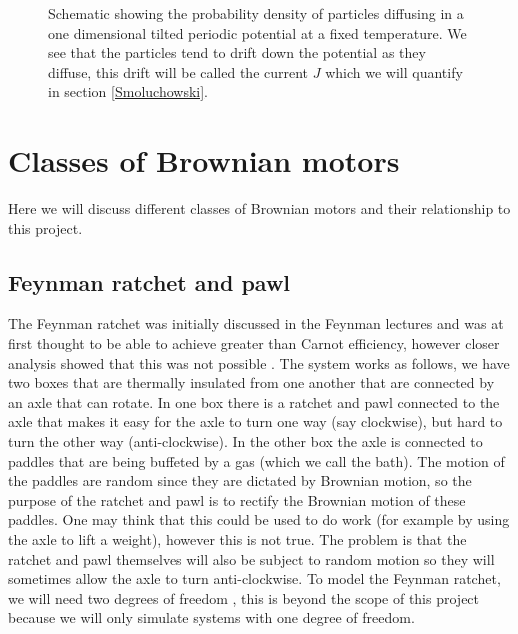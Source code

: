 \begin{figure}[tb]
	\centering
\quad
\caption{Schematic showing the probability density of particles diffusing in a one dimensional tilted periodic potential at a fixed temperature. We see that the particles tend to drift down the potential as they diffuse, this drift will be called the current $J$ which we will quantify in section \ref{Smoluchowski}.}
\label{fig:Schematic}
\end{figure}

\section{Classes of Brownian motors} \label{BrownianMotorClasses}
Here we will discuss different classes of Brownian motors and their relationship to this project.

\subsection{Feynman ratchet and pawl}
The Feynman ratchet was initially discussed in the Feynman lectures \cite{Feynman1963} and was at first thought to be able to achieve greater than Carnot efficiency, however closer analysis showed that this was not possible \cite{ParrondoEspanol1996}. The system works as follows, we have two boxes that are thermally insulated from one another that are connected by an axle that can rotate. In one box there is a ratchet and pawl connected to the axle that makes it easy for the axle to turn one way (say clockwise), but hard to turn the other way (anti-clockwise). In the other box the axle is connected to paddles that are being buffeted by a gas (which we call the bath). The motion of the paddles are random since they are dictated by Brownian motion, so the purpose of the ratchet and pawl is to rectify the Brownian motion of these paddles. One may think that this could be used to do work (for example by using the axle to lift a weight), however this is not true. The problem is that the ratchet and pawl themselves will also be subject to random motion so they will sometimes allow the axle to turn anti-clockwise. To model the Feynman ratchet, we will need two degrees of freedom \cite{M.W.Jack2016}, this is beyond the scope of this project because we will only simulate systems with one degree of freedom.

